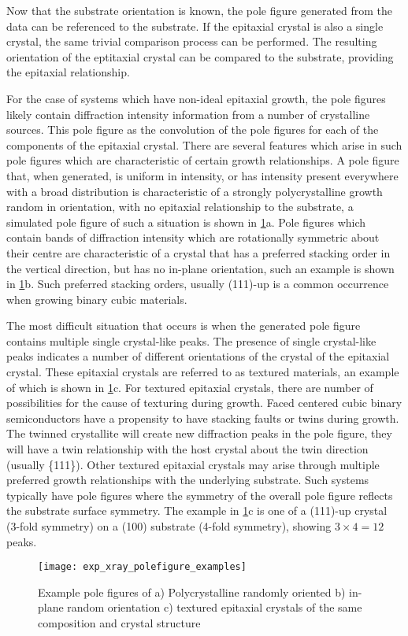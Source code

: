 Now that the substrate orientation is known, the pole figure generated from the data can be referenced to the substrate.
If the epitaxial crystal is also a single crystal, the same trivial comparison process can be performed.
The resulting orientation of the eptitaxial crystal can be compared to the substrate, providing the epitaxial relationship.

For the case of systems which have non-ideal epitaxial growth, the pole figures likely contain diffraction intensity information from a number of crystalline sources.
This pole figure as the convolution of the pole figures for each of the components of the epitaxial crystal.
There are several features which arise in such pole figures which are characteristic of certain growth relationships.
A pole figure that, when generated, is uniform in intensity, or has intensity present everywhere with a broad distribution is characteristic of a strongly polycrystalline growth random in orientation, with no epitaxial relationship to the substrate, a simulated pole figure of such a situation is shown in \cref{fig:exp_xray_polefigure_examples}a.
Pole figures which contain bands of diffraction intensity which are rotationally symmetric about their centre are characteristic of a crystal that has a preferred stacking order in the vertical direction, but has no in-plane orientation, such an example is shown in \cref{fig:exp_xray_polefigure_examples}b.
Such preferred stacking orders, usually (111)-up is a common occurrence when growing binary cubic materials.

The most difficult situation that occurs is when the generated pole figure contains multiple single crystal-like peaks.
The presence of single crystal-like peaks indicates a number of different orientations of the crystal of the epitaxial crystal.
These epitaxial crystals are referred to as textured materials, an example of which is shown in \cref{fig:exp_xray_polefigure_examples}c.
For textured epitaxial crystals, there are number of possibilities for the cause of texturing during growth.
Faced centered cubic binary semiconductors have a propensity to have stacking faults or twins during growth.
The twinned crystallite will create new diffraction peaks in the pole figure, they will have a twin relationship with the host crystal about the twin direction (usually \{111\}).
Other textured epitaxial crystals may arise through multiple preferred growth relationships with the underlying substrate.
Such systems typically have pole figures where the symmetry of the overall pole figure reflects the substrate surface symmetry.
The example in \cref{fig:exp_xray_polefigure_examples}c is one of a (111)-up crystal (3-fold symmetry) on a (100) substrate (4-fold symmetry), showing \(3\times 4=12\) peaks.
\begin{figure}
 \centering \texttt{[image: exp\_xray\_polefigure\_examples]}
 \caption[Example simulated pole figures]{\label{fig:exp_xray_polefigure_examples}Example pole figures of a) Polycrystalline randomly oriented b) in-plane random orientation c) textured epitaxial crystals of the same composition and crystal structure}
\end{figure}

